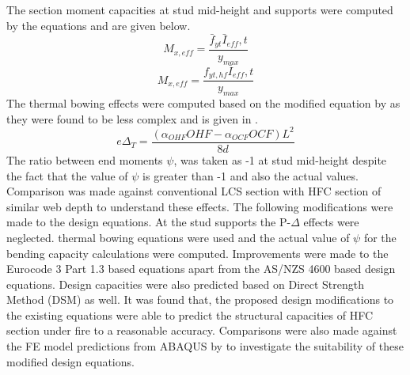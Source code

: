 The section moment capacities at stud mid-height and supports were computed by the equations  and are given below.
\begin{equation}\label{eq:M_mid-height}
M_{x,eff} = \dfrac{\bar{f}_{yt}\bar{I}_{eff},t}{y_{max}}
\end{equation}
\begin{equation}\label{eq:M_support}
M_{x,eff} = \dfrac{f_{yt,hf}\bar{I}_{eff},t}{y_{max}}
\end{equation}
The thermal bowing effects were computed based on the modified equation by \citet{Baleshan2016a} as they were found to be less complex and is given in .
\begin{equation}\label{eq:bal_e-delta}
e\Delta_T = \dfrac{(\alpha_{OHF}OHF-\alpha_{OCF}OCF)L^2}{8d}
\end{equation}
The ratio between end moments $\psi$, was taken as -1 at stud mid-height despite the fact that the value of $\psi$ is greater than -1 and also the actual values. Comparison was made against conventional LCS section with HFC section of similar web depth to understand these effects. The following modifications were made to the design equations. At the stud supports the P-$\Delta$ effects were neglected. \citet{Baleshan2016a} thermal bowing equations were used and the actual value of $\psi$ for the bending capacity calculations were computed. Improvements were made to the Eurocode 3 Part 1.3 based equations apart from the AS/NZS 4600 based design equations. Design capacities were also predicted based on Direct Strength Method (DSM) as well. It was found that, the proposed design modifications to the existing equations were able to predict the structural capacities of HFC section under fire to a reasonable accuracy. Comparisons were also made against the FE model predictions from ABAQUS by \citet{Kesawan2016a} to investigate the suitability of these modified design equations. 

